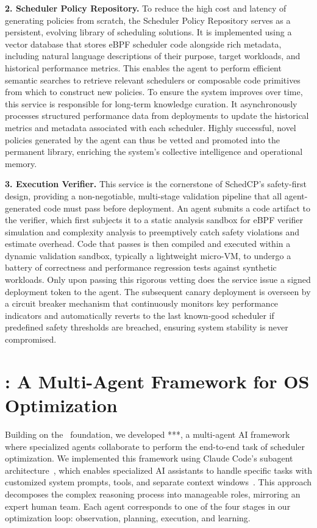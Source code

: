 \textbf{2. Scheduler Policy Repository.} To reduce the high cost and latency of generating policies from scratch, the Scheduler Policy Repository serves as a persistent, evolving library of scheduling solutions. It is implemented using a vector database that stores eBPF scheduler code alongside rich metadata, including natural language descriptions of their purpose, target workloads, and historical performance metrics. This enables the agent to perform efficient semantic searches to retrieve relevant schedulers or composable code primitives from which to construct new policies. To ensure the system improves over time, this service is responsible for long-term knowledge curation. It asynchronously processes structured performance data from deployments to update the historical metrics and metadata associated with each scheduler. Highly successful, novel policies generated by the agent can thus be vetted and promoted into the permanent library, enriching the system's collective intelligence and operational memory.

\textbf{3. Execution Verifier.} This service is the cornerstone of SchedCP's safety-first design, providing a non-negotiable, multi-stage validation pipeline that all agent-generated code must pass before deployment. An agent submits a code artifact to the verifier, which first subjects it to a static analysis sandbox for eBPF verifier simulation and complexity analysis to preemptively catch safety violations and estimate overhead. Code that passes is then compiled and executed within a dynamic validation sandbox, typically a lightweight micro-VM, to undergo a battery of correctness and performance regression tests against synthetic workloads. Only upon passing this rigorous vetting does the service issue a signed deployment token to the agent. The subsequent canary deployment is overseen by a circuit breaker mechanism that continuously monitors key performance indicators and automatically reverts to the last known-good scheduler if predefined safety thresholds are breached, ensuring system stability is never compromised.

\section{\agent: A Multi-Agent Framework for OS Optimization}
\label{sec:sched_agents}

Building on the \sys\ foundation, we developed **\agent**, a multi-agent AI framework where specialized agents collaborate to perform the end-to-end task of scheduler optimization. We implemented this framework using Claude Code's subagent architecture~\cite{anthropic2024subagents}, which enables specialized AI assistants to handle specific tasks with customized system prompts, tools, and separate context windows~\cite{anthropic2024multiagent}. This approach decomposes the complex reasoning process into manageable roles, mirroring an expert human team. Each agent corresponds to one of the four stages in our optimization loop: observation, planning, execution, and learning.

